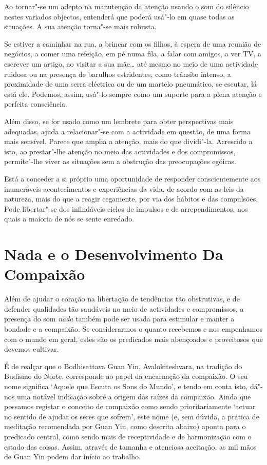 Ao tornar"-se um adepto na manutenção da atenção usando o som do silêncio
nestes variados objectos, entenderá que poderá usá"-lo em quase todas as
situações. A sua atenção torna"-se mais robusta.

Se estiver a caminhar na rua, a brincar com os filhos, à espera de uma
reunião de negócios, a comer uma refeição, em pé numa fila, a falar com
amigos, a ver TV, a escrever um artigo, ao visitar a sua mãe\ldots{} até
mesmo no meio de uma actividade ruidosa ou na presença de barulhos
estridentes, como trânsito intenso, a proximidade de uma serra eléctrica
ou de um martelo pneumático, se escutar, lá está ele. Podemos, assim,
usá"-lo sempre como um suporte para a plena atenção e perfeita
consciência.

Além disso, se for usado como um lembrete para obter perspectivas mais
adequadas, ajuda a relacionar"-se com a actividade em questão, de uma
forma mais sensível. Parece que amplia a atenção, mais do que dividi"-la.
Acrescido a isto, ao prestar"-lhe atenção no meio das actividades e dos
compromissos, permite"-lhe viver as situações sem a obstrução das
preocupações egóicas.

Está a conceder a si próprio uma oportunidade de responder
conscientemente aos inumeráveis acontecimentos e experiências da vida,
de acordo com as leis da natureza, mais do que a reagir cegamente, por
via dos hábitos e das compulsões. Pode libertar"-se dos infindáveis
ciclos de impulsos e de arrependimentos, nos quais a maioria de nós se
sente enredado.

\section{Nada e o Desenvolvimento Da Compaixão}

Além de ajudar o coração na libertação de tendências tão obstrutivas, e
de defender qualidades tão saudáveis no meio de actividades e
compromissos, a presença do som \emph{nada} também pode ser usada para
estimular e manter a bondade e a compaixão. Se considerarmos o quanto
recebemos e nos empenhamos com o mundo em geral, estes são os predicados
mais abençoados e proveitosos que devemos cultivar.

É de realçar que o Bodhisattava Guan Yin, Avalokiteshvara, na tradição
do Budismo do Norte, corresponde ao papel da encarnação da compaixão. O
seu nome significa `Aquele que Escuta os Sons do Mundo', e tendo em
conta isto, dá"-nos uma notável indicação sobre a origem das raízes da
compaixão. Ainda que possamos registar o conceito de compaixão como
sendo prioritariamente `actuar no sentido de ajudar os seres que
sofrem', este nome (e, sem dúvida, a prática de meditação recomendada
por Guan Yin, como descrita abaixo) aponta para o predicado central,
como sendo mais de receptividade e de harmonização com o estado das
coisas. Assim, através de tamanha e atenciosa aceitação, as mil mãos de
Guan Yin podem dar início ao trabalho.

